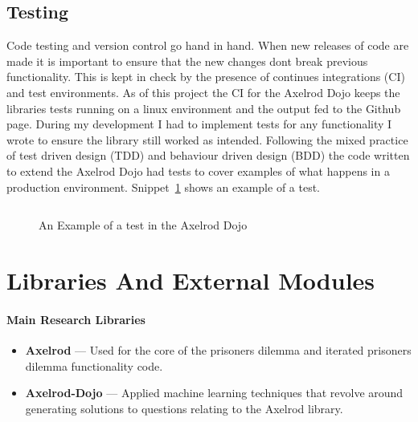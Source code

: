 \subsection{Testing}\label{ssec:testing}
Code testing and version control go hand in hand. 
When new releases of code are made it is important to ensure that the new changes dont break previous functionality.
This is kept in check by the presence of continues integrations (CI) and test environments.
As of this project the CI for the Axelrod Dojo keeps the libraries tests running on a linux environment and the output fed to the Github page.
During my development I had to implement tests for any functionality I wrote to ensure the library still worked as intended.
Following the mixed practice of test driven design (TDD) and behaviour driven design (BDD) the code written to extend the Axelrod Dojo had tests to cover examples of what happens in a production environment.
Snippet~\ref{code:test-example} shows an example of a test.

\begin{figure}[ht]
    \inputminted{python}{code_snippets/dev-examples/example-test.py}
    \caption{An Example of a test in the Axelrod Dojo}\label{code:test-example}
\end{figure}

\section{Libraries And External Modules}
\paragraph{Main Research Libraries}
\begin{itemize}
    \item \textbf{Axelrod} --- Used for the core of the prisoners dilemma and iterated prisoners dilemma functionality code.\cite{axelrodproject}
    \item \textbf{Axelrod-Dojo} --- Applied machine learning techniques that revolve around generating solutions to questions relating to the Axelrod library.
\end{itemize}

